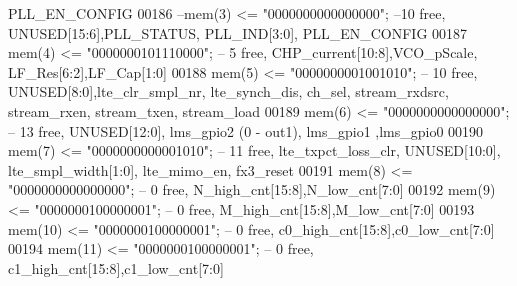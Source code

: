 \begin{DoxyCode}
{       PLL\_EN\_CONFIG}
00186 \textcolor{keyword}{            --mem(3)    <= "0000000000000000"; --10 free, UNUSED[15:6],PLL\_STATUS, PLL\_IND[3:0],
       PLL\_EN\_CONFIG}
00187             \textcolor{vhdlchar}{mem}\textcolor{vhdlchar}{(}\textcolor{vhdllogic}{}\textcolor{vhdllogic}{4}\textcolor{vhdlchar}{)}      \textcolor{vhdlchar}{<=} \textcolor{vhdllogic}{"0000000101110000"};\textcolor{keyword}{ --  5 free, CHP\_current[10:8],VCO\_pScale,
       LF\_Res[6:2],LF\_Cap[1:0] }
00188             \textcolor{vhdlchar}{mem}\textcolor{vhdlchar}{(}\textcolor{vhdllogic}{}\textcolor{vhdllogic}{5}\textcolor{vhdlchar}{)}      \textcolor{vhdlchar}{<=} \textcolor{vhdllogic}{"0000000001001010"};\textcolor{keyword}{ --  10 free, UNUSED[8:0],lte\_clr\_smpl\_nr, lte\_synch\_dis,
       ch\_sel, stream\_rxdsrc, stream\_rxen, stream\_txen, stream\_load}
00189             \textcolor{vhdlchar}{mem}\textcolor{vhdlchar}{(}\textcolor{vhdllogic}{}\textcolor{vhdllogic}{6}\textcolor{vhdlchar}{)}      \textcolor{vhdlchar}{<=} \textcolor{vhdllogic}{"0000000000000000"};\textcolor{keyword}{ --  13 free, UNUSED[12:0], lms\_gpio2 (0 - out1), lms\_gpio1
       ,lms\_gpio0}
00190             \textcolor{vhdlchar}{mem}\textcolor{vhdlchar}{(}\textcolor{vhdllogic}{}\textcolor{vhdllogic}{7}\textcolor{vhdlchar}{)}      \textcolor{vhdlchar}{<=} \textcolor{vhdllogic}{"0000000000001010"};\textcolor{keyword}{ --  11 free, lte\_txpct\_loss\_clr, UNUSED[10:0],
       lte\_smpl\_width[1:0], lte\_mimo\_en, fx3\_reset}
00191             \textcolor{vhdlchar}{mem}\textcolor{vhdlchar}{(}\textcolor{vhdllogic}{}\textcolor{vhdllogic}{8}\textcolor{vhdlchar}{)}      \textcolor{vhdlchar}{<=} \textcolor{vhdllogic}{"0000000000000000"};\textcolor{keyword}{ --  0 free, N\_high\_cnt[15:8],N\_low\_cnt[7:0]}
00192             \textcolor{vhdlchar}{mem}\textcolor{vhdlchar}{(}\textcolor{vhdllogic}{}\textcolor{vhdllogic}{9}\textcolor{vhdlchar}{)}  \textcolor{vhdlchar}{<=} \textcolor{vhdllogic}{"0000000100000001"};\textcolor{keyword}{ --  0 free, M\_high\_cnt[15:8],M\_low\_cnt[7:0]}
00193             \textcolor{vhdlchar}{mem}\textcolor{vhdlchar}{(}\textcolor{vhdllogic}{}\textcolor{vhdllogic}{10}\textcolor{vhdlchar}{)} \textcolor{vhdlchar}{<=} \textcolor{vhdllogic}{"0000000100000001"};\textcolor{keyword}{ --  0 free, c0\_high\_cnt[15:8],c0\_low\_cnt[7:0]}
00194             \textcolor{vhdlchar}{mem}\textcolor{vhdlchar}{(}\textcolor{vhdllogic}{}\textcolor{vhdllogic}{11}\textcolor{vhdlchar}{)} \textcolor{vhdlchar}{<=} \textcolor{vhdllogic}{"0000000100000001"};\textcolor{keyword}{ --  0 free, c1\_high\_cnt[15:8],c1\_low\_cnt[7:0]}

\end{DoxyCode}
